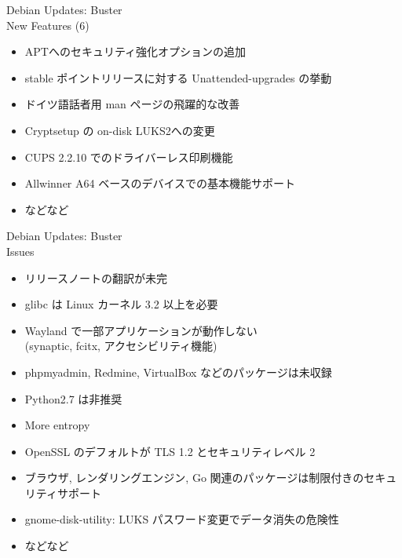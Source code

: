 \documentclass[cjk,c,squeeze,shrink,dvipdfmx,12pt]{beamer}
\begin{document}
\begin{frame}[fragile]{%
    Debian Updates: Buster%
    \\[-.5em]{\normalsize{New Features (6)}}
  }
  \pause
  \begin{itemize}[<+->]
  \item APTへのセキュリティ強化オプションの追加
  \item stable ポイントリリースに対する Unattended-upgrades の挙動
  \item ドイツ語話者用 man ページの飛躍的な改善
  \item Cryptsetup の on-disk LUKS2への変更
  \item CUPS 2.2.10 でのドライバーレス印刷機能
  \item Allwinner A64 ベースのデバイスでの基本機能サポート
  \item などなど
  \end{itemize}
\end{frame}

\begin{frame}[fragile]{%
    Debian Updates: Buster%
    \\[-.5em]{\normalsize{Issues}}
  }
  \pause
  \begin{itemize}[<+->]
  \item リリースノートの翻訳が未完
  \item glibc は Linux カーネル 3.2 以上を必要
  \item Wayland で一部アプリケーションが動作しない\\
    (synaptic, fcitx, アクセシビリティ機能)
  \item phpmyadmin, Redmine, VirtualBox などのパッケージは未収録
  \item Python2.7 は非推奨
  \item More entropy
  \item OpenSSL のデフォルトが TLS 1.2 とセキュリティレベル 2
  \item ブラウザ, レンダリングエンジン, Go 関連のパッケージは制限付きのセキュリティサポート
  \item gnome-disk-utility: LUKS パスワード変更でデータ消失の危険性
  \item などなど
  \end{itemize}
\end{frame}
\end{document}
